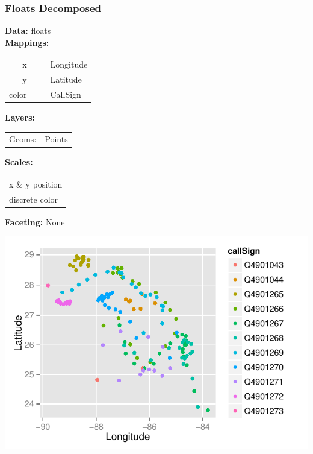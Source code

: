 \documentclass{beamer}\usepackage[]{graphicx}\usepackage[]{color}
\begin{document}
\begin{frame}[fragile]
\frametitle{Floats Decomposed}
\begin{minipage}{.35\linewidth}
\textbf{Data:} floats \\
\textbf{Mappings:}
\footnotesize

\begin{tabular}{rcl}
x&=&Longitude \\
y&=&Latitude\\
color&=&CallSign\\
\end{tabular}\normalsize

\textbf{Layers:} 
\footnotesize

\begin{tabular}{rl}
Geoms: & Points\\
\end{tabular}
\normalsize

\textbf{Scales:} 
\footnotesize

\begin{tabular}{l}
x \& y position\\
discrete color
\end{tabular}
\normalsize

\textbf{Faceting:} None
\end{minipage}
\begin{minipage}{.6\linewidth}\centering
\includegraphics[keepaspectratio=TRUE,width=.92\linewidth]{figure/kfloats3}
\end{minipage}
\end{frame}


\end{document}
